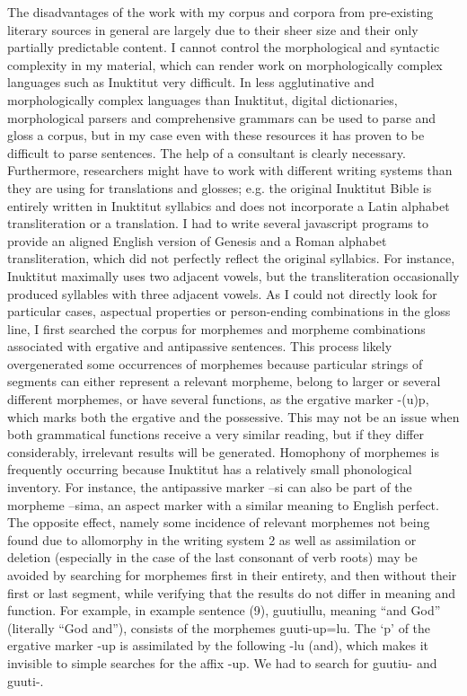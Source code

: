 \documentclass[12pt]{article}
\begin{document}
The disadvantages of the work with my corpus and corpora from pre-existing literary sources in general are largely due to their sheer size and their only partially predictable content. I cannot control the morphological and syntactic complexity in my material, which can render work on morphologically complex languages such as Inuktitut very difficult. In less agglutinative and morphologically complex languages than Inuktitut, digital dictionaries, morphological parsers and comprehensive grammars can be used to parse and gloss a corpus, but in my case even with these resources it has proven to be difficult to parse sentences. The help of a consultant is clearly necessary. 
Furthermore, researchers might have to work with different writing systems than they are using for translations and glosses; e.g. the original Inuktitut Bible is entirely written in Inuktitut syllabics and does not incorporate a Latin alphabet transliteration or a translation. I had to write several javascript programs to provide an aligned English version of Genesis and a Roman alphabet transliteration, which did not perfectly reflect the original syllabics. For instance, Inuktitut maximally uses two adjacent vowels, but the transliteration occasionally produced syllables with three adjacent vowels.
As I could not directly look for particular cases, aspectual properties or person-ending combinations in the gloss line, I first searched the corpus for morphemes and morpheme combinations associated with ergative and antipassive sentences. This process likely overgenerated some occurrences of morphemes because particular strings of segments can either represent a relevant morpheme, belong to larger or several different morphemes, or have several functions, as the ergative marker -(u)p, which marks both the ergative and the possessive. This may not be an issue when both grammatical functions receive a very similar reading, but if they differ considerably, irrelevant results will be generated. Homophony of morphemes is frequently occurring because Inuktitut has a relatively small phonological inventory. For instance, the antipassive marker –si can also be part of the morpheme –sima, an aspect marker with a similar meaning to English perfect. 
The opposite effect, namely some incidence of relevant morphemes not being found due to allomorphy in the writing system 2 as well as assimilation or deletion (especially in the case of the last consonant of verb roots) may be avoided by searching for morphemes first in their entirety, and then without their first or last segment, while verifying that the results do not differ in meaning and function. For example, in example sentence (9), guutiullu, meaning “and God” (literally “God and”), consists of the morphemes guuti-up=lu. The ‘p’ of the ergative marker -up is assimilated by the following -lu (and), which makes it invisible to simple searches for the affix -up. We had to search for guutiu- and guuti-.
\end{document}
